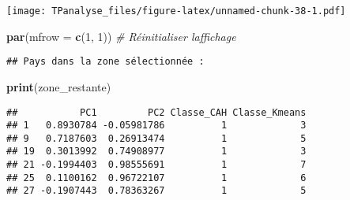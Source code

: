 \documentclass[
]{article}
\newenvironment{Shaded}{\begin{snugshade}}{\end{snugshade}}
\newcommand{\AttributeTok}[1]{\textcolor[rgb]{0.13,0.29,0.53}{#1}}
\newcommand{\CommentTok}[1]{\textcolor[rgb]{0.56,0.35,0.01}{\textit{#1}}}
\newcommand{\DecValTok}[1]{\textcolor[rgb]{0.00,0.00,0.81}{#1}}
\newcommand{\FunctionTok}[1]{\textcolor[rgb]{0.13,0.29,0.53}{\textbf{#1}}}
\newcommand{\NormalTok}[1]{#1}
\newcommand{\OtherTok}[1]{\textcolor[rgb]{0.56,0.35,0.01}{#1}}
\newcommand{\SpecialCharTok}[1]{\textcolor[rgb]{0.81,0.36,0.00}{\textbf{#1}}}
\newcommand{\StringTok}[1]{\textcolor[rgb]{0.31,0.60,0.02}{#1}}
\begin{document}
\texttt{[image: TPanalyse\_files/figure-latex/unnamed-chunk-38-1.pdf]}

\begin{Shaded}
\begin{Highlighting}[]
\FunctionTok{par}\NormalTok{(}\AttributeTok{mfrow =} \FunctionTok{c}\NormalTok{(}\DecValTok{1}\NormalTok{, }\DecValTok{1}\NormalTok{))  }\CommentTok{\# Réinitialiser l\textquotesingle{}affichage}
\end{Highlighting}
\end{Shaded}

\begin{Shaded}
\end{Shaded}

\begin{verbatim}
## Pays dans la zone sélectionnée :
\end{verbatim}

\begin{Shaded}
\begin{Highlighting}[]
\FunctionTok{print}\NormalTok{(zone\_restante)}
\end{Highlighting}
\end{Shaded}

\begin{verbatim}
##           PC1         PC2 Classe_CAH Classe_Kmeans
## 1   0.8930784 -0.05981786          1             3
## 9   0.7187603  0.26913474          1             5
## 19  0.3013992  0.74908977          1             3
## 21 -0.1994403  0.98555691          1             7
## 25  0.1100162  0.96722107          1             6
## 27 -0.1907443  0.78363267          1             5
\end{verbatim}
\end{document}
